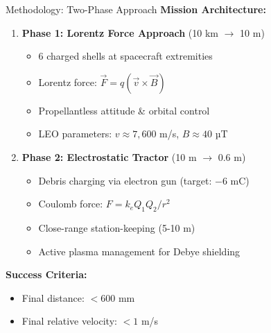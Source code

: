 \documentclass[aspectratio=169]{beamer}
\begin{document}
\begin{frame}{Methodology: Two-Phase Approach}
\textbf{Mission Architecture:}

\begin{enumerate}
    \item \textbf{Phase 1: Lorentz Force Approach} (10 km $\rightarrow$ 10 m)
    \begin{itemize}
        \item 6 charged shells at spacecraft extremities
        \item Lorentz force: $\vec{F} = q(\vec{v} \times \vec{B})$
        \item Propellantless attitude \& orbital control
        \item LEO parameters: $v \approx 7,600$ m/s, $B \approx 40$ µT
    \end{itemize}

    \vspace{0.2cm}
    \item \textbf{Phase 2: Electrostatic Tractor} (10 m $\rightarrow$ 0.6 m)
    \begin{itemize}
        \item Debris charging via electron gun (target: $-6$ mC)
        \item Coulomb force: $F = k_e Q_1 Q_2 / r^2$
        \item Close-range station-keeping (5-10 m)
        \item Active plasma management for Debye shielding
    \end{itemize}
\end{enumerate}

\vspace{0.3cm}
\textbf{Success Criteria:}
\begin{itemize}
    \item Final distance: $< 600$ mm
    \item Final relative velocity: $< 1$ m/s
\end{itemize}
\end{frame}
\end{document}
